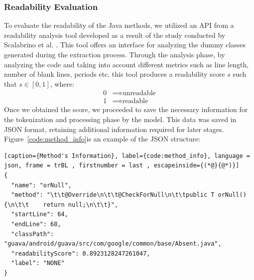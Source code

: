 \subsubsection{Readability Evaluation} %
\label{sub:Calculate readability}
To evaluate the readability of the Java methods, we utilized an API from a readability analysis tool developed as a result of the study conducted by Scalabrino et al. \cite{Scalabrino2018}. This tool offers an interface for analyzing the dummy classes generated during the extraction process. Through the analysis phase, by analyzing the code and taking into account different metrics such as line length, number of blank lines, periods etc. this tool produces a readability score \( s \) such that \( s \in [0,1] \), where:
\[
	\begin{aligned}
		0 & \implies \text{unreadable} \\
		1 & \implies \text{readable}
	\end{aligned}
\]
\newline
Once we obtained the score, we proceeded to save the necessary information for the tokenization and processing phase by the model. This data was saved in JSON format, retaining additional information required for later stages. Figure~\ref{code:method_info}is an example of the JSON structure:
\begin{lstlisting}[caption={Method's Information}, label={code:method_info}, language = json, frame = trBL , firstnumber = last , escapeinside={(*@}{@*)}]
{
  "name": "orNull",
  "method": "\t\t@Override\n\t\t@CheckForNull\n\t\tpublic T orNull(){\n\t\t    return null;\n\t\t}",
  "startLine": 64,
  "endLine": 68,
  "classPath": "guava/android/guava/src/com/google/common/base/Absent.java",
  "readabilityScore": 0.8923128247261047,
  "label": "NONE"
}
\end{lstlisting}

